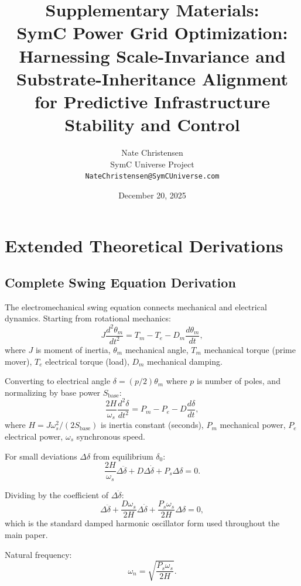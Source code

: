 \documentclass[11pt,letterpaper]{article}
\title{\textbf{Supplementary Materials:\\SymC Power Grid Optimization: Harnessing Scale-Invariance and Substrate-Inheritance Alignment for Predictive Infrastructure Stability and Control}}
\author{Nate Christensen\\
SymC Universe Project\\
\texttt{NateChristensen@SymCUniverse.com}}
\date{December 20, 2025}
\begin{document}
\maketitle

\section{Extended Theoretical Derivations}

\subsection{Complete Swing Equation Derivation}

The electromechanical swing equation connects mechanical and electrical dynamics. Starting from rotational mechanics:
\begin{equation}
J\frac{d^2\theta_m}{dt^2} = T_m - T_e - D_m\frac{d\theta_m}{dt},
\end{equation}
where $J$ is moment of inertia, $\theta_m$ mechanical angle, $T_m$ mechanical torque (prime mover), $T_e$ electrical torque (load), $D_m$ mechanical damping.

Converting to electrical angle $\delta = (p/2)\theta_m$ where $p$ is number of poles, and normalizing by base power $S_{\text{base}}$:
\begin{equation}
\frac{2H}{\omega_s}\frac{d^2\delta}{dt^2} = P_m - P_e - D\frac{d\delta}{dt},
\end{equation}
where $H = J\omega_s^2/(2S_{\text{base}})$ is inertia constant (seconds), $P_m$ mechanical power, $P_e$ electrical power, $\omega_s$ synchronous speed.

For small deviations $\Delta\delta$ from equilibrium $\delta_0$:
\begin{equation}
\frac{2H}{\omega_s}\Delta\ddot{\delta} + D\Delta\dot{\delta} + P_s\Delta\delta = 0.
\end{equation}

Dividing by the coefficient of $\Delta\ddot{\delta}$:
\begin{equation}
\Delta\ddot{\delta} + \frac{D\omega_s}{2H}\Delta\dot{\delta} + \frac{P_s\omega_s}{2H}\Delta\delta = 0,
\end{equation}
which is the standard damped harmonic oscillator form used throughout the main paper.

Natural frequency:
\begin{equation}
\omega_n = \sqrt{\frac{P_s\omega_s}{2H}}.
\end{equation}
\end{document}
